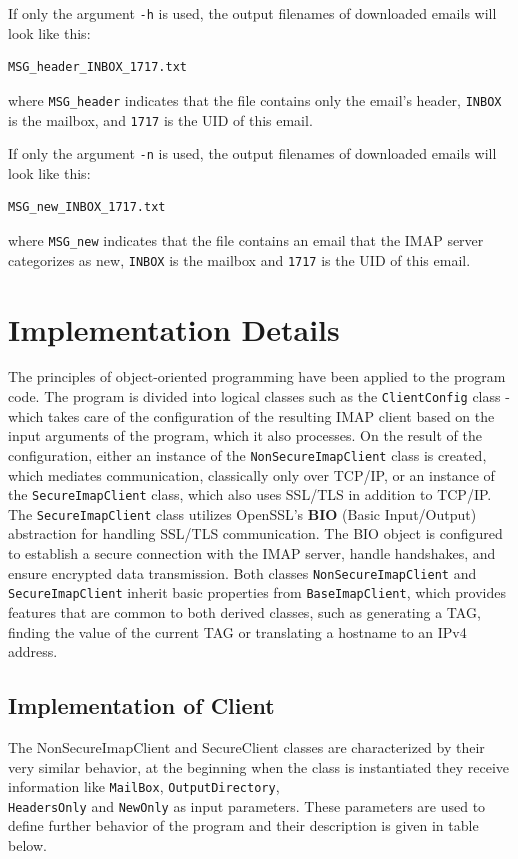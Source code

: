 \documentclass[a4paper,11pt]{article}
\begin{document}
If only the argument \texttt{-h} is used, the output filenames of downloaded emails will look like this:
\begin{verbatim}
MSG_header_INBOX_1717.txt
\end{verbatim}
where \texttt{MSG\_header} indicates that the file contains only the email's header, \texttt{INBOX} is the mailbox, and \texttt{1717} is the UID of this email.

If only the argument \texttt{-n} is used, the output filenames of downloaded emails will look like this:
\begin{verbatim}
MSG_new_INBOX_1717.txt
\end{verbatim}
where \texttt{MSG\_new} indicates that the file contains an email that the IMAP server categorizes as new, \texttt{INBOX} is the mailbox and \texttt{1717} is the UID of this email.


\section{Implementation Details}
The principles of object-oriented programming have been applied to the program code. The program is 
divided into logical classes such as the \verb!ClientConfig! class - which takes care of the configuration 
of the resulting IMAP client based on the input arguments of the program, which it also processes. 
On the result of the configuration, either an instance of the \verb!NonSecureImapClient! class is created, 
which mediates communication, classically only over TCP/IP, or an instance of the \verb!SecureImapClient! 
class, which also uses SSL/TLS in addition to TCP/IP. The \verb!SecureImapClient! class utilizes OpenSSL's 
\textbf{BIO} (Basic Input/Output) abstraction for handling SSL/TLS communication. The BIO object is configured 
to establish a secure connection with the IMAP server, handle handshakes, and ensure encrypted data transmission. 
Both classes \verb!NonSecureImapClient! and \verb!SecureImapClient! inherit basic properties from \verb!BaseImapClient!, 
which provides features that are common to both derived classes, such as generating a TAG, finding the value of the 
current TAG or translating a hostname to an IPv4 address.\cite{openssl_tutorial}

\subsection{Implementation of Client}
The NonSecureImapClient and SecureClient classes are characterized by their very 
similar behavior, at the beginning when the class is instantiated they receive information 
like \verb!MailBox!, \verb!OutputDirectory!, \\ 
\verb!HeadersOnly! and \verb!NewOnly! as input parameters. These parameters are used to define 
further behavior of the program and their description is given in table below.
\end{document}
